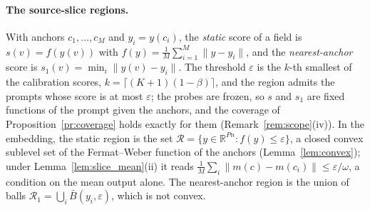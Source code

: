 \documentclass{article}
\newcommand{\RR}{\mathbb{R}}
\theoremstyle{plain}
\theoremstyle{remark}
\begin{document}
\paragraph{The source-slice regions.}
With anchors $c_1,\dots,c_M$ and $y_i=y(c_i)$, the \emph{static} score of a field is $s(v)=f(y(v))$ with
$f(y)=\frac1M\sum_{i=1}^M\|y-y_i\|$, and the \emph{nearest-anchor} score is $s_1(v)=\min_i\|y(v)-y_i\|$. The threshold $\varepsilon$ is
the $k$-th smallest of the calibration scores, $k=\lceil(K+1)(1-\beta)\rceil$, and the region admits the prompts whose score is at
most $\varepsilon$; the probes are frozen, so $s$ and $s_1$ are fixed functions of the prompt given the anchors, and the coverage of
Proposition~\ref{pr:coverage} holds exactly for them (Remark~\ref{rem:scope}(iv)). In the embedding, the static region is the set
$\mathcal R=\{y\in\RR^{Pn}:f(y)\le\varepsilon\}$, a closed convex sublevel set of the Fermat--Weber function of the anchors
(Lemma~\ref{lem:convex}); under Lemma~\ref{lem:slice_mean}(ii) it reads $\frac1M\sum_i\|m(c)-m(c_i)\|\le\varepsilon/\omega$, a
condition on the mean output alone. The nearest-anchor region is the union of balls $\mathcal R_1=\bigcup_i\bar B(y_i,\varepsilon)$,
which is not convex.
\end{document}
